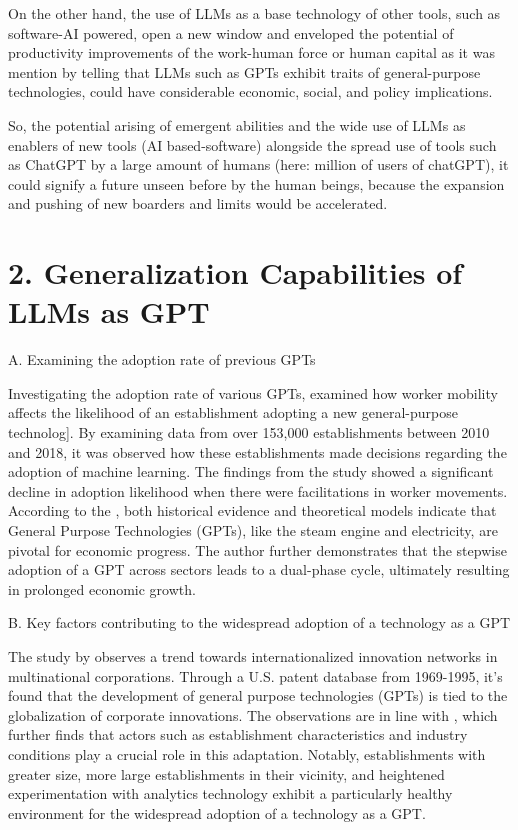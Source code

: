 \documentclass[preprint, 3p,
authoryear]{elsarticle} %
\begin{document}
On the other hand, the use of LLMs as a base technology of other tools,
such as software-AI powered, open a new window and enveloped the
potential of productivity improvements of the work-human force or human
capital as it was mention by \citep{gptaregpts} telling that LLMs such
as GPTs exhibit traits of general-purpose technologies, could have
considerable economic, social, and policy implications.

So, the potential arising of emergent abilities and the wide use of LLMs
as enablers of new tools (AI based-software) alongside the spread use of
tools such as ChatGPT by a large amount of humans (here: million of
users of chatGPT), it could signify a future unseen before by the human
beings, because the expansion and pushing of new boarders and limits
would be accelerated.

\hypertarget{generalization-capabilities-of-llms-as-gpt}{%
\section{2. Generalization Capabilities of LLMs as
GPT}\label{generalization-capabilities-of-llms-as-gpt}}

A. Examining the adoption rate of previous GPTs

Investigating the adoption rate of various GPTs, \citep{Chen2021HowDL}
examined how worker mobility affects the likelihood of an establishment
adopting a new general-purpose technolog{]}. By examining data from over
153,000 establishments between 2010 and 2018, it was observed how these
establishments made decisions regarding the adoption of machine
learning. The findings from the study showed a significant decline in
adoption likelihood when there were facilitations in worker movements.
According to the \citep{Helpman1996DiffusionOG}, both historical
evidence and theoretical models indicate that General Purpose
Technologies (GPTs), like the steam engine and electricity, are pivotal
for economic progress. The author further demonstrates that the stepwise
adoption of a GPT across sectors leads to a dual-phase cycle, ultimately
resulting in prolonged economic growth.

B. Key factors contributing to the widespread adoption of a technology
as a GPT

The study by \citep{Qiu2018TheIG} observes a trend towards
internationalized innovation networks in multinational corporations.
Through a U.S. patent database from 1969-1995, it's found that the
development of general purpose technologies (GPTs) is tied to the
globalization of corporate innovations. The observations are in line
with \citep{Chen2021HowDL}, which further finds that actors such as
establishment characteristics and industry conditions play a crucial
role in this adaptation. Notably, establishments with greater size, more
large establishments in their vicinity, and heightened experimentation
with analytics technology exhibit a particularly healthy environment for
the widespread adoption of a technology as a GPT.
\end{document}
